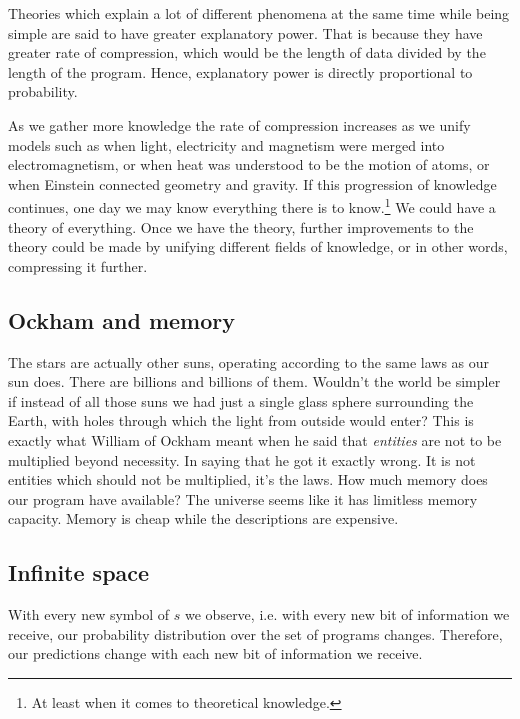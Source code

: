 
Theories which explain a lot of different phenomena at the same time while being simple are said to have greater explanatory power.
That is because they have greater rate of compression, which would be the length of data divided by the length of the program.
Hence, explanatory power is directly proportional to probability.

As we gather more knowledge the rate of compression increases as we unify models such as when light, electricity and magnetism were merged into electromagnetism, or when heat was understood to be the motion of atoms, or when Einstein connected geometry and gravity.
If this progression of knowledge continues, one day we may know everything there is to know.\footnote{At least when it comes to theoretical knowledge.}
We could have a theory of everything.
Once we have the theory, further improvements to the theory could be made by unifying different fields of knowledge, or in other words, compressing it further.

\newpage

\subsection{Ockham and memory}

The stars are actually other suns, operating according to the same laws as our sun does.
There are billions and billions of them.
Wouldn't the world be simpler if instead of all those suns we had just a single glass sphere surrounding the Earth, with holes through which the light from outside would enter?
This is exactly what William of Ockham meant when he said that \textit{entities} are not to be multiplied beyond necessity.
In saying that he got it exactly wrong.
It is not entities which should not be multiplied, it's the laws.
How much memory does our program have available?
The universe seems like it has limitless memory capacity.
Memory is cheap while the descriptions are expensive.

\newpage

\subsection{Infinite space}

With every new symbol of $s$ we observe, i.e. with every new bit of information we receive, our probability distribution over the set of programs changes.
Therefore, our predictions change with each new bit of information we receive.

